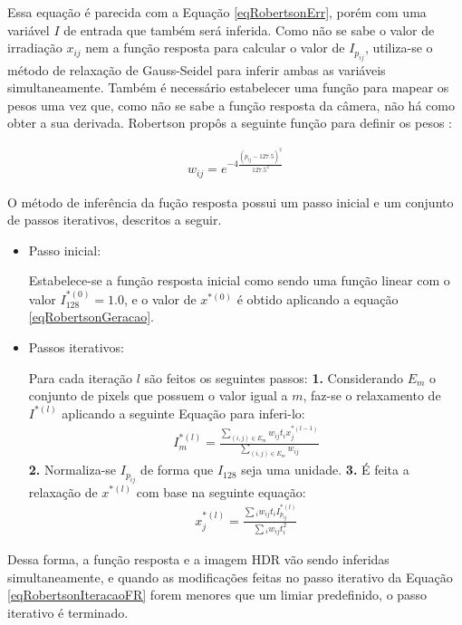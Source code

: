 Essa equação é parecida com a Equação \ref{eqRobertsonErr}, porém com uma variável $I$ de entrada que também será inferida. Como não se sabe o valor de irradiação $x_{ij}$ nem a função resposta para calcular o valor de $I_{p_{ij}}$, utiliza-se o método de relaxação de Gauss-Seidel para inferir ambas as variáveis simultaneamente. Também é necessário estabelecer uma função para mapear os pesos uma vez que, como não se sabe a função resposta da câmera, não há como obter a sua derivada. Robertson propôs a seguinte função para definir os pesos \cite{robertson2}:

\begin{align} \label{eqRobertsonErr3}
	w_{ij} = e^{-4\frac{(p_{ij}-127.5)^2}{127.5^2}}
\end{align}

O método de inferência da fução resposta possui um passo inicial e um conjunto de passos iterativos, descritos a seguir.

\begin{itemize}
\item Passo inicial:

Estabelece-se a função resposta inicial como sendo uma função linear com o valor $I_{128}^{*(0)} = 1.0$, e o valor de $x^{*(0)}$ é obtido aplicando a equação \ref{eqRobertsonGeracao}.

\item Passos iterativos:

Para cada iteração $l$ são feitos os seguintes passos:
\subitem \textbf{1.} Considerando $E_m$ o conjunto de pixels que possuem o valor igual a $m$, faz-se o relaxamento de $I^{*(l)}$ aplicando a seguinte Equação para inferi-lo:
\begin{align} \label{eqRobertsonIteracaoFR}
	I^{*(l)}_m = \frac{\sum\limits_{(i,j) \in E_m}{w_{ij}t_{i}x_{j}^{*(l-1)}}}{\sum\limits_{(i,j) \in E_m}{w_{ij}}}
\end{align}
\subitem \textbf{2.} Normaliza-se $I_{p_{ij}}$ de forma que $I_{128}$ seja uma unidade.
\subitem \textbf{3.} É feita a relaxação de $x^{*(l)}$ com base na seguinte equação:
\begin{align} \label{eqRobertsonIteracaoHDR}
	x^{*(l)}_j = \frac{\sum{_i w_{ij}t_{i}I^{*(l)}_{p_{ij}}}}{\sum{_i w_{ij}t_{i}^2}}
\end{align}
\end{itemize}

Dessa forma, a função resposta e a imagem HDR vão sendo inferidas simultaneamente, e quando as modificações feitas no passo iterativo da Equação \ref{eqRobertsonIteracaoFR} forem menores que um limiar predefinido, o passo iterativo é terminado.

